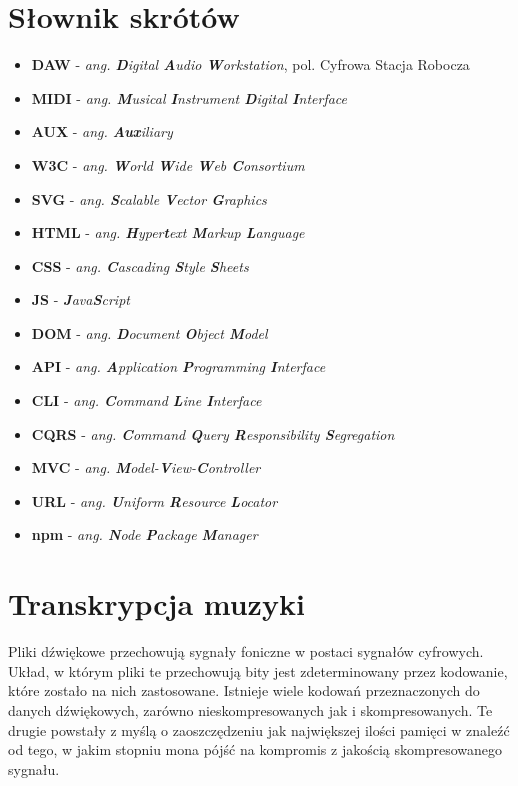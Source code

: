 \documentclass[12pt,a4paper,twoside]{mwart}
\begin{document}
\section{Słownik skrótów}
\begin{itemize}
\item \textbf{DAW} - \textit{ang. \textbf{D}igital \textbf{A}udio \textbf{W}orkstation}, pol. Cyfrowa Stacja Robocza 
\item \textbf{MIDI} - \textit{ang. \textbf{M}usical \textbf{I}nstrument \textbf{D}igital \textbf{I}nterface}
\item \textbf{AUX} - \textit{ang. \textbf{Aux}iliary}
\item \textbf{W3C} - \textit{ang. \textbf{W}orld \textbf{W}ide \textbf{W}eb \textbf{C}onsortium}
\item \textbf{SVG} - \textit{ang. \textbf{S}calable \textbf{V}ector \textbf{G}raphics}
\item \textbf{HTML} - \textit{ang. \textbf{H}yper\textbf{t}ext \textbf{M}arkup \textbf{L}anguage}
\item \textbf{CSS} - \textit{ang.  \textbf{C}ascading \textbf{S}tyle \textbf{S}heets}
\item \textbf{JS} - \textit{\textbf{J}ava\textbf{S}cript}
\item \textbf{DOM} - \textit{ang. \textbf{D}ocument \textbf{O}bject \textbf{M}odel}
\item \textbf{API} - \textit{ang. \textbf{A}pplication \textbf{P}rogramming \textbf{I}nterface}
\item \textbf{CLI} - \textit{ang. \textbf{C}ommand \textbf{L}ine \textbf{I}nterface}
\item \textbf{CQRS} - \textit{ang. \textbf{C}ommand \textbf{Q}uery \textbf{R}esponsibility \textbf{S}egregation}
\item \textbf{MVC} - \textit{ang. \textbf{M}odel-\textbf{V}iew-\textbf{C}ontroller}
\item \textbf{URL} - \textit{ang. \textbf{U}niform \textbf{R}esource \textbf{L}ocator }
\item \textbf{npm} - \textit{ang. \textbf{N}ode \textbf{P}ackage \textbf{M}anager}
  
\end{itemize}
\newpage
\setcounter{secnumdepth}{2}

\section{Transkrypcja muzyki}
Pliki dźwiękowe przechowują sygnały foniczne w postaci sygnałów cyfrowych. Układ, w którym pliki te przechowują bity jest zdeterminowany przez kodowanie, które zostało na nich zastosowane. Istnieje wiele kodowań przeznaczonych do danych dźwiękowych, zarówno nieskompresowanych jak i skompresowanych. Te drugie powstały z myślą o zaoszczędzeniu jak największej ilości pamięci w znaleźć od tego, w jakim stopniu mona pójść na kompromis z jakością skompresowanego sygnału.
\end{document}
